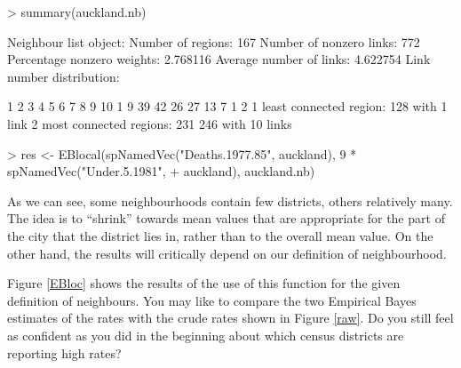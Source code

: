 \documentclass[a4paper,10pt]{article}
\begin{document}
\begin{footnotesize}
\begin{Schunk}
\begin{Sinput}
> summary(auckland.nb)
\end{Sinput}
\begin{Soutput}
Neighbour list object:
Number of regions: 167 
Number of nonzero links: 772 
Percentage nonzero weights: 2.768116 
Average number of links: 4.622754 
Link number distribution:

 1  2  3  4  5  6  7  8  9 10 
 1  9 39 42 26 27 13  7  1  2 
1 least connected region:
128 with 1 link
2 most connected regions:
231 246 with 10 links
\end{Soutput}
\begin{Sinput}
> res <- EBlocal(spNamedVec("Deaths.1977.85", auckland), 9 * spNamedVec("Under.5.1981", 
+     auckland), auckland.nb)
\end{Sinput}
\end{Schunk}
\end{footnotesize}
As we can see, some neighbourhoods contain few districts, others relatively many. The idea is to ``shrink'' towards mean values that are appropriate for the part of the city that the district lies in, rather than to the overall mean value. On the other hand, the results will critically depend on our definition of neighbourhood.


\begin{footnotesize}
\begin{Schunk}
\end{Schunk}
\begin{Schunk}
\end{Schunk}
\end{footnotesize}
Figure \ref{EBloc} shows the results of the use of this function for the given definition of neighbours. You may like to compare the two Empirical Bayes estimates of the rates with the crude rates shown in Figure \ref{raw}. Do you still feel as confident as you did in the beginning about which census districts are reporting high rates?
\end{document}
